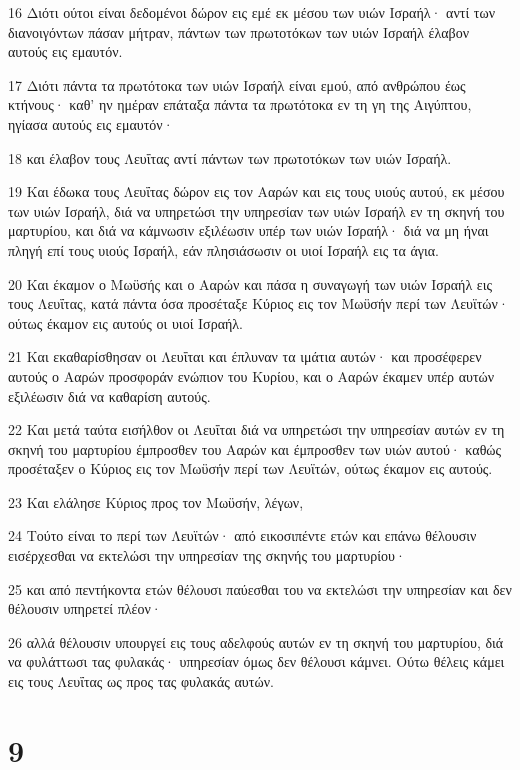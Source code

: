 \par 16 Διότι ούτοι είναι δεδομένοι δώρον εις εμέ εκ μέσου των υιών Ισραήλ· αντί των διανοιγόντων πάσαν μήτραν, πάντων των πρωτοτόκων των υιών Ισραήλ έλαβον αυτούς εις εμαυτόν.
\par 17 Διότι πάντα τα πρωτότοκα των υιών Ισραήλ είναι εμού, από ανθρώπου έως κτήνους· καθ' ην ημέραν επάταξα πάντα τα πρωτότοκα εν τη γη της Αιγύπτου, ηγίασα αυτούς εις εμαυτόν·
\par 18 και έλαβον τους Λευΐτας αντί πάντων των πρωτοτόκων των υιών Ισραήλ.
\par 19 Και έδωκα τους Λευΐτας δώρον εις τον Ααρών και εις τους υιούς αυτού, εκ μέσου των υιών Ισραήλ, διά να υπηρετώσι την υπηρεσίαν των υιών Ισραήλ εν τη σκηνή του μαρτυρίου, και διά να κάμνωσιν εξιλέωσιν υπέρ των υιών Ισραήλ· διά να μη ήναι πληγή επί τους υιούς Ισραήλ, εάν πλησιάσωσιν οι υιοί Ισραήλ εις τα άγια.
\par 20 Και έκαμον ο Μωϋσής και ο Ααρών και πάσα η συναγωγή των υιών Ισραήλ εις τους Λευΐτας, κατά πάντα όσα προσέταξε Κύριος εις τον Μωϋσήν περί των Λευϊτών· ούτως έκαμον εις αυτούς οι υιοί Ισραήλ.
\par 21 Και εκαθαρίσθησαν οι Λευΐται και έπλυναν τα ιμάτια αυτών· και προσέφερεν αυτούς ο Ααρών προσφοράν ενώπιον του Κυρίου, και ο Ααρών έκαμεν υπέρ αυτών εξιλέωσιν διά να καθαρίση αυτούς.
\par 22 Και μετά ταύτα εισήλθον οι Λευΐται διά να υπηρετώσι την υπηρεσίαν αυτών εν τη σκηνή του μαρτυρίου έμπροσθεν του Ααρών και έμπροσθεν των υιών αυτού· καθώς προσέταξεν ο Κύριος εις τον Μωϋσήν περί των Λευϊτών, ούτως έκαμον εις αυτούς.
\par 23 Και ελάλησε Κύριος προς τον Μωϋσήν, λέγων,
\par 24 Τούτο είναι το περί των Λευϊτών· από εικοσιπέντε ετών και επάνω θέλουσιν εισέρχεσθαι να εκτελώσι την υπηρεσίαν της σκηνής του μαρτυρίου·
\par 25 και από πεντήκοντα ετών θέλουσι παύεσθαι του να εκτελώσι την υπηρεσίαν και δεν θέλουσιν υπηρετεί πλέον·
\par 26 αλλά θέλουσιν υπουργεί εις τους αδελφούς αυτών εν τη σκηνή του μαρτυρίου, διά να φυλάττωσι τας φυλακάς· υπηρεσίαν όμως δεν θέλουσι κάμνει. Ούτω θέλεις κάμει εις τους Λευΐτας ως προς τας φυλακάς αυτών.

\chapter{9}


